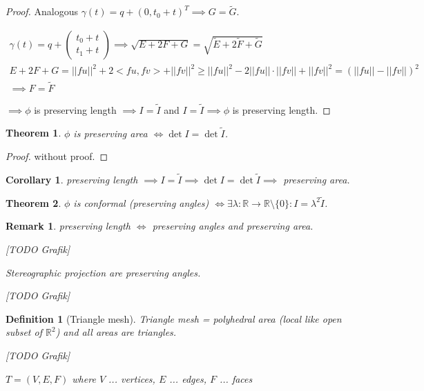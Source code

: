 \documentclass[]{article}
\newtheorem{theorem}{Theorem}
\newtheorem{definition}{Definition}
\newtheorem{remark}{Remark}
\newtheorem{corollary}{Corollary}
\begin{document}
\begin{proof}
	Analogous $\gamma(t) = q + (0, t_0+t)^T \implies G = \tilde{G}$.
	
	\begin{align*}
		\gamma(t) = q + \left(\begin{matrix}
			t_0 + t \\ t_1 + t
		\end{matrix}\right) \implies \sqrt{E + 2F + G} = \sqrt{\tilde{E} + 2\tilde{F} + \tilde{G}}\\
		E+2F+G = ||fu||^2 + 2 <fu, fv> + ||fv||^2 \geq ||fu||^2 - 2||fu||\cdot ||fv|| + ||fv||^2 = (||fu||- ||fv||)^2\\
		\implies F = \tilde{F}
	\end{align*}
	
	$\implies \phi$ is preserving length $\implies I = \tilde{I}$ and $I = \tilde{I} \implies \phi$ is preserving length.
\end{proof}

\begin{theorem}
	$\phi$ is preserving area $\iff \det I = \det \tilde{I}$.
\end{theorem}

\begin{proof}
	without proof.
\end{proof}

\begin{corollary}
	preserving length $\implies I = \tilde{I} \implies \det I = \det \tilde{I} \implies$ preserving area.
\end{corollary}

\begin{theorem}
	$\phi$ is conformal (preserving angles) $\iff \exists \lambda: \mathbb{R} \rightarrow \mathbb{R}\setminus\{0\}: I = \lambda^2 \tilde{I}$.
\end{theorem}

\begin{remark}
	preserving length $\iff$ preserving angles and preserving area.
	
	[TODO Grafik]
	
	Stereographic projection are preserving angles.
	
	[TODO Grafik]
\end{remark}

\begin{definition}[Triangle mesh]
	Triangle mesh = polyhedral area (local like open subset of $\mathbb{R}^2$) and all areas are triangles.
	
	[TODO Grafik]
	
	$T=(V,E,F)$ where $V$ ... vertices, $E$ ... edges, $F$ ... faces
\end{definition}
\end{document}
